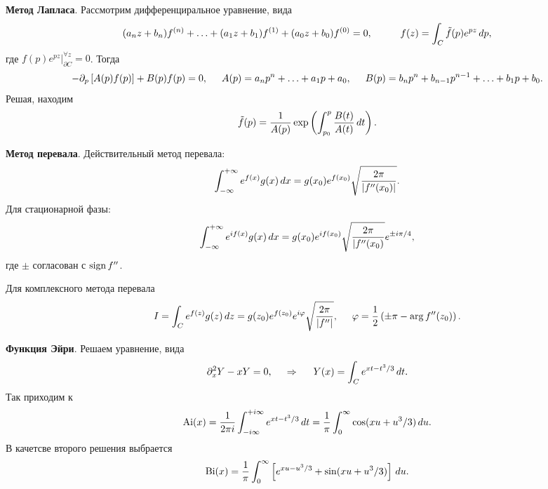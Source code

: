 \textbf{Метод Лапласа}. Рассмотрим дифференциральное уравнение, вида
\begin{equation*}
    (a_n z + b_n) f^{(n)} + \ldots + (a_1 z + b_1) f^{(1)} + (a_0 z + b_0) f^{(0)} = 0,
    \hspace{10 mm} 
    f(z) = \int_C \tilde{f} (p) e^{pz} \d p,
\end{equation*}
где $f(p) e^{pz} |_{\partial C}^{\forall  z} = 0$. Тогда
\begin{equation*}
    - \partial_p \left[ A(p) f(p)\right] + B(p) f(p) = 0,
    \hspace{5 mm} 
    A(p) = a_n p^n +\ldots + a_1 p + a_0,
    \hspace{5 mm} 
    B(p) = b_n p^n + b_{n-1} p^{n-1} + \ldots + b_1 p + b_0.
\end{equation*}
Решая, находим
\begin{equation*}
    \tilde{f}(p) = \frac{1}{A(p)} \exp\left(
        \int_{p_0}^{p} \frac{B(t)}{A(t)}\, d t
    \right).
\end{equation*}


\textbf{Метод перевала}. Действительный метод перевала:
\begin{equation*}
    \int_{-\infty}^{+\infty} e^{f(x)} g(x) \, d x = g(x_0) e^{f(x_0)} \sqrt{\frac{2\pi}{|f''(x_0)|}}.
\end{equation*}
Для стационарной фазы:
\begin{equation*}
    \int_{-\infty}^{+\infty} e^{i f(x)} g(x) \, d x = g(x_0) e^{i f (x_0)} 
    \sqrt{\frac{2\pi}{|f''(x_0)}} e^{\pm i \pi/4},
\end{equation*} 
где $\pm$ согласован с $\mathop{\mathrm{sign}}\nolimits f''$. 

Для комплексного метода перевала
\begin{equation*}
    I = \int_C e^{f(z)} g(z) \, d z = g(z_0) e^{f(z_0)} e^{i \varphi} \sqrt{\frac{2\pi}{|f''|}},
    \hspace{5 mm} 
    \varphi = \frac{1}{2}\left(\pm \pi - \arg f''(z_0) \right).
\end{equation*}




\textbf{Функция Эйри}. Решаем уравнение, вида
\begin{equation*}
    \partial_x^2 Y - x Y = 0,
    \hspace{0.5cm} \Rightarrow \hspace{0.5cm}
    Y(x) = \int_C e^{x t - t^3/3} \, d t.
\end{equation*}
Так приходим к
\begin{equation*}
    \textnormal{Ai} (x) = 
    \frac{1}{2 \pi i} \int_{- i \infty}^{+i \infty} e^{xt - t^3/3} \, d t= 
    \frac{1}{\pi} \int_{0}^{\infty} \cos(x u + u^3/3) \, d u.
\end{equation*}
В качетсве второго решения выбрается 
\begin{equation*}
    \textnormal{Bi} (x) = \frac{1}{\pi} \int_{0}^{\infty} \left[
        e^{xu - u^3/3}  + \sin (xu + u^3/3)
    \right]\, d u.
\end{equation*}
